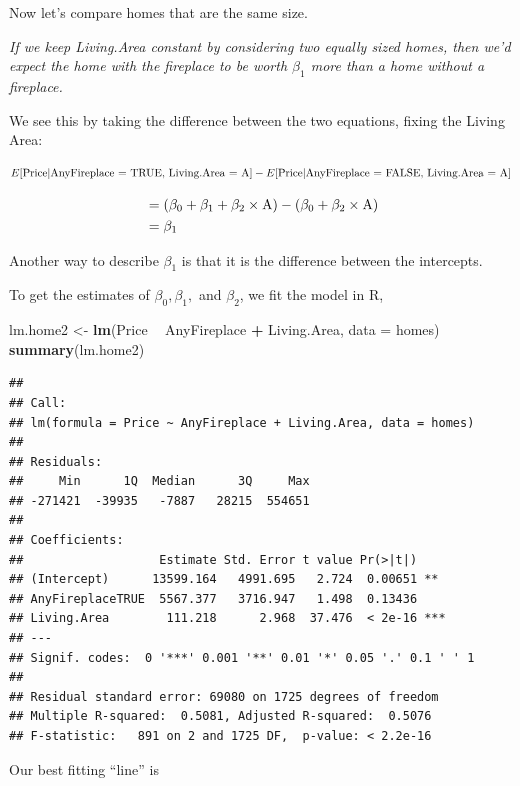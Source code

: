 \documentclass[
]{book}
\newenvironment{Shaded}{\begin{snugshade}}{\end{snugshade}}
\newcommand{\DataTypeTok}[1]{\textcolor[rgb]{0.13,0.29,0.53}{#1}}
\newcommand{\KeywordTok}[1]{\textcolor[rgb]{0.13,0.29,0.53}{\textbf{#1}}}
\newcommand{\NormalTok}[1]{#1}
\newcommand{\OperatorTok}[1]{\textcolor[rgb]{0.81,0.36,0.00}{\textbf{#1}}}
\newcommand{\StringTok}[1]{\textcolor[rgb]{0.31,0.60,0.02}{#1}}
\begin{document}
Now let's compare homes that are the same size.

\emph{If we keep Living.Area constant by considering two equally sized homes, then we'd expect the home with the fireplace to be worth \(\beta_1\) more than a home without a fireplace.}

We see this by taking the difference between the two equations, fixing the Living Area:

\[E[\hbox{Price}| \hbox{AnyFireplace = TRUE, Living.Area = A}] - E[\hbox{Price}| \hbox{AnyFireplace = FALSE, Living.Area = A}]\]

\begin{align*}
\,&= (\beta_0+\beta_1 + \beta_2 \times \hbox{A}) - ( \beta_0 + \beta_2 \times \hbox{A})\\
\,&= \beta_1
\end{align*}

Another way to describe \(\beta_1\) is that it is the difference between the intercepts.

To get the estimates of \(\beta_0,\beta_1,\) and \(\beta_2\), we fit the model in R,

\begin{Shaded}
\begin{Highlighting}[]
\NormalTok{lm.home2 <-}\StringTok{ }\KeywordTok{lm}\NormalTok{(Price }\OperatorTok{~}\StringTok{ }\NormalTok{AnyFireplace }\OperatorTok{+}\StringTok{ }\NormalTok{Living.Area, }\DataTypeTok{data =}\NormalTok{ homes)}
\KeywordTok{summary}\NormalTok{(lm.home2)}
\end{Highlighting}
\end{Shaded}

\begin{verbatim}
## 
## Call:
## lm(formula = Price ~ AnyFireplace + Living.Area, data = homes)
## 
## Residuals:
##     Min      1Q  Median      3Q     Max 
## -271421  -39935   -7887   28215  554651 
## 
## Coefficients:
##                   Estimate Std. Error t value Pr(>|t|)    
## (Intercept)      13599.164   4991.695   2.724  0.00651 ** 
## AnyFireplaceTRUE  5567.377   3716.947   1.498  0.13436    
## Living.Area        111.218      2.968  37.476  < 2e-16 ***
## ---
## Signif. codes:  0 '***' 0.001 '**' 0.01 '*' 0.05 '.' 0.1 ' ' 1
## 
## Residual standard error: 69080 on 1725 degrees of freedom
## Multiple R-squared:  0.5081,	Adjusted R-squared:  0.5076 
## F-statistic:   891 on 2 and 1725 DF,  p-value: < 2.2e-16
\end{verbatim}

Our best fitting ``line'' is
\end{document}
